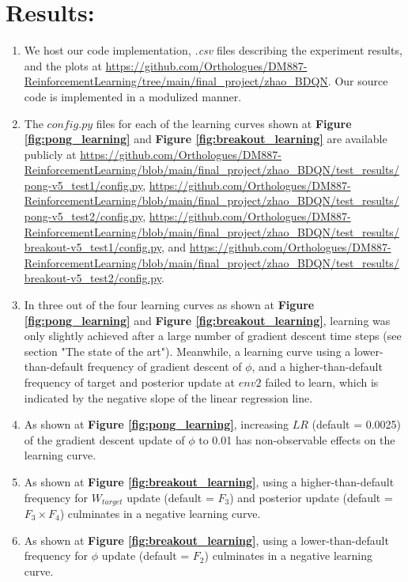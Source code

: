 \documentclass{article}
\begin{document}
\section{Results:}
\begin{enumerate}
    \item We host our code implementation, \textit{.csv} files describing the experiment results, and the plots at \url{https://github.com/Orthologues/DM887-ReinforcementLearning/tree/main/final_project/zhao_BDQN}. Our source code is implemented in a modulized manner.
    \item The $config.py$ files for each of the learning curves shown at \textbf{Figure \ref{fig:pong_learning}} and \textbf{Figure \ref{fig:breakout_learning}} are available publicly at \url{https://github.com/Orthologues/DM887-ReinforcementLearning/blob/main/final_project/zhao_BDQN/test_results/pong-v5_test1/config.py}, \url{https://github.com/Orthologues/DM887-ReinforcementLearning/blob/main/final_project/zhao_BDQN/test_results/pong-v5_test2/config.py}, \url{https://github.com/Orthologues/DM887-ReinforcementLearning/blob/main/final_project/zhao_BDQN/test_results/breakout-v5_test1/config.py}, and \url{https://github.com/Orthologues/DM887-ReinforcementLearning/blob/main/final_project/zhao_BDQN/test_results/breakout-v5_test2/config.py}.
    \item In three out of the four learning curves as shown at \textbf{Figure \ref{fig:pong_learning}} and \textbf{Figure \ref{fig:breakout_learning}}, learning was only slightly achieved after a large number of gradient descent time steps (see section "The state of the art"). Meanwhile, a learning curve using a lower-than-default frequency of gradient descent of $\phi$, and a higher-than-default frequency of target and posterior update at $env2$ failed to learn, which is indicated by the negative slope of the linear regression line.
    \item As shown at \textbf{Figure \ref{fig:pong_learning}}, increasing $LR$ (default = 0.0025) of the gradient descent update of $\phi$ to 0.01 has non-observable effects on the learning curve.
    \item As shown at \textbf{Figure \ref{fig:breakout_learning}}, using a higher-than-default frequency for $W_{target}$ update (default = $F_3$) and posterior update (default = $F_3 \times F_4$) culminates in a negative learning curve.
    \item As shown at \textbf{Figure \ref{fig:breakout_learning}}, using a lower-than-default frequency for $\phi$ update (default = $F_2$) culminates in a negative learning curve.
\end{enumerate}
\end{document}
